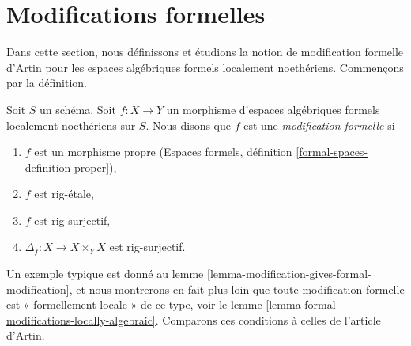 \section{Modifications formelles}
\label{section-formal-modifications}

\noindent
Dans cette section, nous définissons et étudions la notion de modification
formelle d'Artin pour les espaces algébriques formels localement noethériens.
Commençons par la définition.

\begin{definition}
\label{definition-formal-modification}
Soit $S$ un schéma. Soit $f : X \to Y$ un morphisme d'espaces
algébriques formels localement noethériens sur $S$. Nous disons que $f$
est une {\it modification formelle} si
\begin{enumerate}
\item $f$ est un morphisme propre (Espaces formels, définition
\ref{formal-spaces-definition-proper}),
\item $f$ est rig-étale,
\item $f$ est rig-surjectif,
\item $\Delta_f : X \to X \times_Y X$ est rig-surjectif.
\end{enumerate}
\end{definition}

\noindent
Un exemple typique est donné au
lemme \ref{lemma-modification-gives-formal-modification},
et nous montrerons en fait plus loin que toute modification formelle est
« formellement locale » de ce type, voir le
lemme \ref{lemma-formal-modifications-locally-algebraic}.
Comparons ces conditions à celles de l'article d'Artin.

